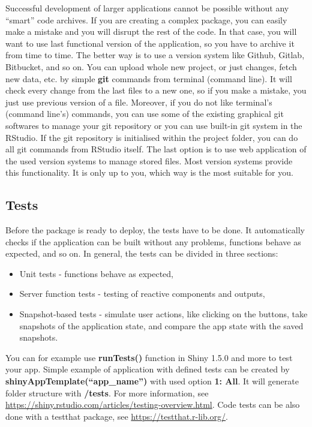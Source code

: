\documentclass[
]{article}
\providecommand{\tightlist}{%
  \setlength{\itemsep}{0pt}\setlength{\parskip}{0pt}}
\begin{document}
Successful development of larger applications cannot be possible without
any ``smart'' code archives. If you are creating a complex package, you
can easily make a mistake and you will disrupt the rest of the code. In
that case, you will want to use last functional version of the
application, so you have to archive it from time to time. The better way
is to use a version system like Github, Gitlab, Bitbucket, and so on.
You can upload whole new project, or just changes, fetch new data, etc.
by simple \textbf{git} commands from terminal (command line). It will
check every change from the last files to a new one, so if you make a
mistake, you just use previous version of a file. Moreover, if you do
not like terminal's (command line's) commands, you can use some of the
existing graphical git softwares to manage your git repository or you
can use built-in git system in the RStudio. If the git repository is
initialised within the project folder, you can do all git commands from
RStudio itself. The last option is to use web application of the used
version systems to manage stored files. Most version systems provide
this functionality. It is only up to you, which way is the most suitable
for you.

\hypertarget{tests}{%
\subsection{Tests}\label{tests}}

Before the package is ready to deploy, the tests have to be done. It
automatically checks if the application can be built without any
problems, functions behave as expected, and so on. In general, the tests
can be divided in three sections:

\begin{itemize}
\tightlist
\item
  Unit tests - functions behave as expected,
\item
  Server function tests - testing of reactive components and outputs,
\item
  Snapshot-based tests - simulate user actions, like clicking on the
  buttons, take snapshots of the application state, and compare the app
  state with the saved snapshots.
\end{itemize}

You can for example use \textbf{runTests()} function in Shiny 1.5.0 and
more to test your app. Simple example of application with defined tests
can be created by \textbf{shinyAppTemplate(``app\_name'')} with used
option \textbf{1: All}. It will generate folder structure with
\textbf{/tests}. For more information, see
\url{https://shiny.rstudio.com/articles/testing-overview.html}. Code
tests can be also done with a testthat package, see
\url{https://testthat.r-lib.org/}.
\end{document}

